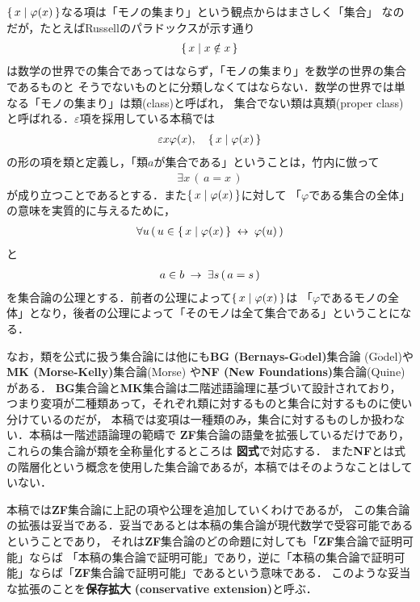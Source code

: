 	$\{\, x \mid \varphi(x)\, \}$なる項は「モノの集まり」という観点からはまさしく「集合」
	なのだが，たとえばRussellのパラドックスが示す通り
	\begin{align}
		\{\, x \mid x \notin x\, \}
	\end{align}
	は数学の世界での集合であってはならず，「モノの集まり」を数学の世界の集合であるものと
	そうでないものとに分類しなくてはならない．数学の世界では単なる「モノの集まり」は類(class)と呼ばれ，
	集合でない類は真類(proper class)と呼ばれる．$\varepsilon$項を採用している本稿では
	\begin{align}
		\varepsilon x \varphi(x),\quad \{\, x \mid \varphi(x)\, \}
	\end{align}
	の形の項を類と定義し，「類$a$が集合である」ということは，竹内\cite{TakeuchiSet}に倣って
	\begin{align}
		\exists x\, (\, a = x\, )
	\end{align}
	が成り立つことであるとする．また$\{\, x \mid \varphi(x)\, \}$に対して
	「$\varphi$である集合の全体」の意味を実質的に与えるために，
	\begin{align}
		\forall u\, (\, u \in \{\, x \mid \varphi(x)\, \} \hspace{0.25em}\leftrightarrow\hspace{0.25em} \varphi(u)\, )
	\end{align}
	と
	\begin{align}
		a \in b \hspace{0.25em}\rightarrow\hspace{0.25em} \exists s\, (\, a = s\, )
	\end{align}
	を集合論の公理とする．前者の公理によって$\{\, x \mid \varphi(x)\, \}$は
	「$\varphi$であるモノの全体」となり，後者の公理によって「そのモノは全て集合である」ということになる．
	
	なお，類を公式に扱う集合論には他にも{\bf BG (Bernays-G$\ddot{\mbox{o}}$del)}集合論
	(G$\ddot{\mbox{o}}$del\cite{Godel})や{\bf MK (Morse-Kelly)}集合論(Morse\cite{Morse})
	や{\bf NF (New Foundations)}集合論(Quine\cite{Quine})がある．
	{\bf BG}集合論と{\bf MK}集合論は二階述語論理に基づいて設計されており，
	つまり変項が二種類あって，それぞれ類に対するものと集合に対するものに使い分けているのだが，
	本稿では変項は一種類のみ，集合に対するものしか扱わない．本稿は一階述語論理の範疇で
	{\bf ZF}集合論の語彙を拡張しているだけであり，これらの集合論が類を全称量化するところは
	{\bf 図式}で対応する．
	また{\bf NF}とは式の階層化という概念を使用した集合論であるが，本稿ではそのようなことはしていない．
	
	本稿では{\bf ZF}集合論に上記の項や公理を追加していくわけであるが，
	この集合論の拡張は妥当である．妥当であるとは本稿の集合論が現代数学で受容可能であるということであり，
	それは{\bf ZF}集合論のどの命題に対しても「{\bf ZF}集合論で証明可能」ならば
	「本稿の集合論で証明可能」であり，逆に「本稿の集合論で証明可能」ならば「{\bf ZF}集合論で証明可能」であるという意味である．
	このような妥当な拡張のことを{\bf 保存拡大}
	{\bf (conservative extension)}と呼ぶ．
	
